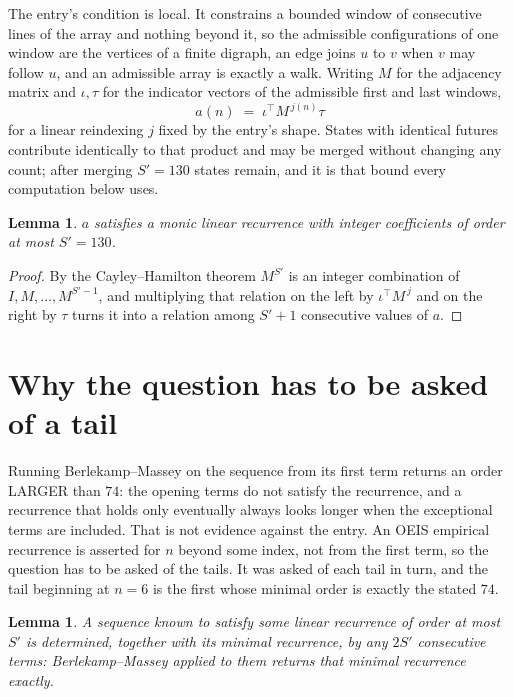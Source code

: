 \documentclass[11pt,a4paper]{article}
\theoremstyle{plain}
\newtheorem{lemma}[theorem]{Lemma}
\theoremstyle{definition}
\begin{document}
The entry's condition is local. It constrains a bounded window of consecutive lines of the
array and nothing beyond it, so the admissible configurations of one window are the vertices of
a finite digraph, an edge joins $u$ to $v$ when $v$ may follow $u$, and an admissible array is
exactly a walk. Writing $M$ for the adjacency matrix and $\iota,\tau$ for the indicator vectors
of the admissible first and last windows,
\[
a(n)\;=\;\iota^{\!\top}M^{\,j(n)}\tau
\]
for a linear reindexing $j$ fixed by the entry's shape. States with identical futures
contribute identically to that product and may be merged without changing any count; after
merging $S'=130$ states remain, and it is that bound every computation below uses.

\begin{lemma}\label{lem:cf}
$a$ satisfies a monic linear recurrence with integer coefficients of order at most $S'=130$.
\end{lemma}

\begin{proof}
By the Cayley--Hamilton theorem $M^{S'}$ is an integer combination of $I,M,\dots,M^{S'-1}$,
and multiplying that relation on the left by $\iota^{\!\top}M^{\,j}$ and on the right by
$\tau$ turns it into a relation among $S'+1$ consecutive values of $a$.
\end{proof}

\section{Why the question has to be asked of a tail}

Running Berlekamp--Massey on the sequence from its first term returns an order LARGER than $74$: the opening terms do not satisfy the recurrence, and a recurrence that holds only eventually always looks longer when the exceptional terms are included. That is not evidence against the entry. An OEIS empirical recurrence is asserted for $n$ beyond some index, not from the first term, so the question has to be asked of the tails. It was asked of each tail in turn, and the tail beginning at $n=6$ is the first whose minimal order is exactly the stated $74$.

\begin{lemma}\label{lem:bm}
A sequence known to satisfy some linear recurrence of order at most $S'$ is determined,
together with its minimal recurrence, by any $2S'$ consecutive terms: Berlekamp--Massey applied
to them returns that minimal recurrence exactly.
\end{lemma}
\end{document}
